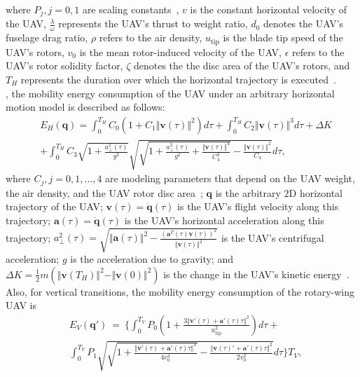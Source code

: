 \documentclass[10pt, twocolumn]{IEEEtran}
\begin{document}
where $P_{j},j{=}0,1$ are scaling constants~\cite{UAV_Propulsion_1}, $v$ is the constant horizontal velocity of the UAV, $\frac{\lambda}{\omega}$ represents the UAV's thrust to weight ratio, $d_{0}$ denotes the UAV's fuselage drag ratio, $\rho$ refers to the air density, $u_{\mathrm{tip}}$ is the blade tip speed of the UAV's rotors, $v_{0}$ is the mean rotor-induced velocity of the UAV, $\epsilon$ refers to the UAV's rotor solidity factor, $\zeta$ denotes the the disc area of the UAV's rotors, and $T_{H}$ represents the duration over which the horizontal trajectory is executed~\cite{UAV_Propulsion_1}.\\
, the mobility energy consumption of the UAV under an arbitrary horizontal motion model is described as follows:
\begin{align*}
    &E_{H}(\mathbf{q}){=}\int_{0}^{T_{H}}C_{0}\left(1{+}C_{1}\Vert\mathbf{v}(\tau)\Vert^{2}\right)d\tau{+}\int_{0}^{T_{H}}C_{2}\Vert\mathbf{v}(\tau)\Vert^{3}d\tau{+}\Delta K\\&{+}\int_{0}^{T_{H}}C_{3}\sqrt{1{+}\frac{a_{\perp}^{2}(\tau)}{g^{2}}}\sqrt{\sqrt{1{+}\frac{a_{\perp}^{2}(\tau)}{g^{2}}{+}\frac{\Vert\mathbf{v}(\tau)\Vert^{4}}{C_{4}^{2}}}{-}\frac{\Vert\mathbf{v}(\tau)\Vert^{2}}{C_{4}}}d\tau,
\end{align*}
where $C_{j},j{=}0,1,{\dots},4$ are modeling parameters that depend on the UAV weight, the air density, and the UAV rotor disc area~\cite{UAV_Propulsion_1}; $\mathbf{q}$ is the arbitrary $2$D horizontal trajectory of the UAV; $\mathbf{v}(\tau){=}\dot{\mathbf{q}}(\tau)$ is the UAV's flight velocity along this trajectory; $\mathbf{a}(\tau){=}\ddot{\mathbf{q}}(\tau)$ is the UAV's horizontal acceleration along this trajectory; $a_{\perp}^{2}(\tau){=}\sqrt{\Vert\mathbf{a}(\tau)\Vert^{2}{-}\frac{(\mathbf{a}^{T}(\tau)\mathbf{v}(\tau))^{2}}{\Vert\mathbf{v}(\tau)\Vert^{2}}}$ is the UAV's centrifugal acceleration; $g$ is the acceleration due to gravity; and $\Delta K{=}\frac{1}{2}m(\Vert\mathbf{v}(T_{H})\Vert^{2}{-}\Vert\mathbf{v}(0)\Vert^{2})$ is the change in the UAV's kinetic energy~\cite{UAV_Propulsion_1}. Also, for vertical transitions, the mobility energy consumption of the rotary-wing UAV is
\vspace{0.1mm}
\begin{align*}
    &E_{V}(\mathbf{q}')\ =\ \Bigg\{\int_{0}^{T_{V}}P_{0}\left(1{+}\frac{3\Vert\mathbf{v}'(\tau){+}\mathbf{a}'(\tau)\tau\Vert^{2}}{u_{\mathrm{tip}}^{2}}\right)d\tau{+}\\&\int_{0}^{T_{V}}P_{1}\sqrt{\sqrt{1{+}\frac{\Vert\mathbf{v}'(\tau){+}\mathbf{a}'(\tau)\tau\Vert^{4}}{4v_{0}^{4}}}{-}\frac{\Vert\mathbf{v}(\tau)'{+}\mathbf{a}'(\tau)\tau\Vert^{2}}{2v_{0}^{2}}}d\tau\Bigg\}T_{V},
\end{align*}
\end{document}
